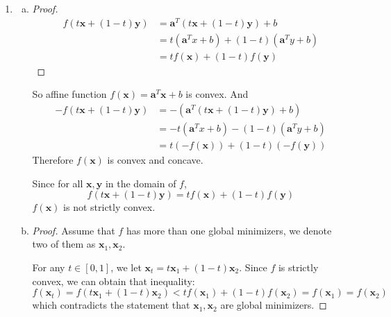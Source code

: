 \documentclass[12pt]{article}
\renewcommand{\vec}[1]{\mathbf{#1}}
\begin{document}
\begin{enumerate}[1)]
\begin{enumerate}[(a)]
\begin{proof}
            Therefore
                       $$\vec{x}^{T}A\vec{x}  = \sum_{i=1}^{d}\lambda_{i}(\vec{x}^{T}\vec{u}_{i})^{2} > 0$$
              implies $A$ is PD.
        \end{proof}
    \end{enumerate}
    \item
    \begin{enumerate}[(a)]
    	\item
        \begin{proof}
        \begin{align*}
        	f(t\vec{x}+(1-t)\vec{y}) & = \vec{a}^{T}(t\vec{x} + (1-t)\vec{y}) + b \\
            & = t(\vec{a}^{T}x + b) + (1-t)(\vec{a}^{T}y + b) \\
            & = tf(\vec{x}) + (1-t)f(\vec{y})
        \end{align*}
        \end{proof}
        So affine function $f(\vec{x}) = \vec{a}^{T}\vec{x} + b$ is convex.
        And 
        \begin{align*}
        	-f(t\vec{x} + (1-t)\vec{y}) & = -( \vec{a}^{T}(t\vec{x} + (1-t)\vec{y}) + b) \\
            & = -t(\vec{a}^{T}x + b) - (1-t)(\vec{a}^{T}y + b) \\
            & = t(-f(\vec{x})) + (1-t)(-f(\vec{y}))
        \end{align*}
        Therefore $f(\vec{x})$ is convex and concave.
        
        Since for all $\vec{x}, \vec{y}$ in the domain of $f$, $$f(t\vec{x} + (1-t)\vec{y})= tf(\vec{x}) + (1-t)f(\vec{y})$$  $f(\vec{x})$ is not strictly convex.
        \item
        \begin{proof}
        	Assume that $f$ has more than one global minimizers,  we denote two of them as $\vec{x}_{1}, \vec{x}_{2}$.
            
            For any $t \in [0, 1]$, we let $\vec{x}_{t} = t\vec{x}_{1} + (1-t)\vec{x}_{2}$. Since $f$ is strictly convex, we can obtain that inequality:
            $$f(\vec{x}_{t}) = f(t\vec{x}_{1} + (1-t)\vec{x}_{2}) < tf(\vec{x}_{1}) + (1-t)f(\vec{x}_{2}) = f(\vec{x}_{1}) = f(\vec{x}_{2})$$
            which contradicts the statement that $\vec{x}_{1}, \vec{x}_{2}$ are global minimizers.
            

\end{proof}
\end{enumerate}
\end{enumerate}
\end{document}
